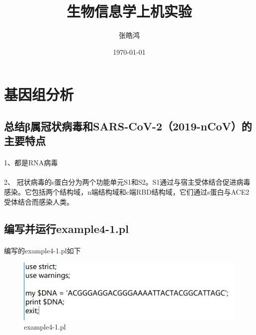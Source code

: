 \documentclass[supercite]{HustGraduPaper}
\title{生物信息学上机实验} %
\author{张皓鸿} %
\date{\today} %
\begin{document}
	\maketitle[logo color=black]

	\clearpage %
	\tableofcontents
	\clearpage%

	\section{基因组分析}
	\subsection{总结β属冠状病毒和SARS-CoV-2（2019-nCoV）的主要特点}
  \paragraph{}\label{subpara:subpara}1、都是RNA病毒
	\paragraph{}\label{subpara:subpara}2、 冠状病毒的s蛋白分为两个功能单元S1和S2。S1通过与宿主受体结合促进病毒感染。它包括两个结构域，n端结构域和c端RBD结构域，它们通过s蛋白与ACE2受体结合而感染人类。

  \subsection{编写并运行example4-1.pl}
	\paragraph{}编写的example4-1.pl如下
  \begin{figure}[H]
		\centering
  	\includegraphics{./material/practice1/perl_1.jpg}
  	\caption{example4-1.pl}
  \end{figure}
\end{document}
